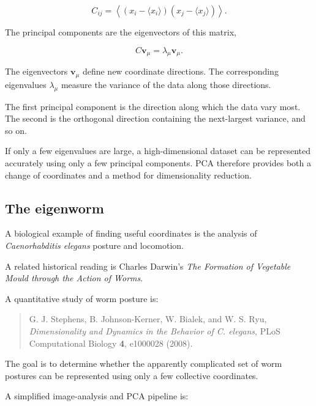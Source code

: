 \begin{equation}
    C_{ij}=\left\langle\left(x_i-\langle x_i\rangle\right)\left(x_j-\langle x_j\rangle\right)\right\rangle.
\end{equation}

The principal components are the eigenvectors of this matrix,

\begin{equation}
    C\mathbf{v}_{\mu}=\lambda_{\mu}\mathbf{v}_{\mu}.
\end{equation}

The eigenvectors $\mathbf{v}_{\mu}$ define new coordinate directions.
The corresponding eigenvalues $\lambda_{\mu}$ measure the variance of the data along those directions.

The first principal component is the direction along which the data vary most.
The second is the orthogonal direction containing the next-largest variance, and so on.

If only a few eigenvalues are large, a high-dimensional dataset can be represented accurately using only a few principal components.
PCA therefore provides both a change of coordinates and a method for dimensionality reduction.


\subsection{The eigenworm}

A biological example of finding useful coordinates is the analysis of \textit{Caenorhabditis elegans} posture and locomotion.

A related historical reading is Charles Darwin's \textit{The Formation of Vegetable Mould through the Action of Worms}.

A quantitative study of worm posture is:

\begin{quote}
G. J. Stephens, B. Johnson-Kerner, W. Bialek, and W. S. Ryu,
\textit{Dimensionality and Dynamics in the Behavior of C. elegans},
PLoS Computational Biology \textbf{4}, e1000028 (2008).
\end{quote}

The goal is to determine whether the apparently complicated set of worm postures can be represented using only a few collective coordinates.

A simplified image-analysis and PCA pipeline is:

